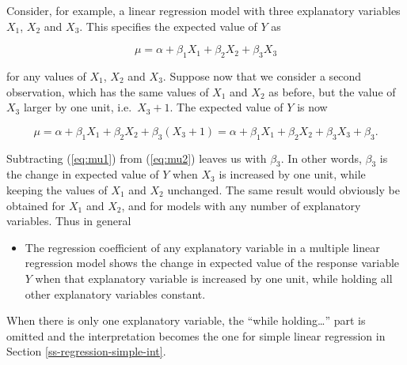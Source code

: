 \documentclass[11pt,a4paper,openany]{book}
\providecommand{\tightlist}{%
  \setlength{\itemsep}{0pt}\setlength{\parskip}{0pt}}
\begin{document}
Consider, for example, a linear regression model with three explanatory
variables \(X_{1}\), \(X_{2}\) and \(X_{3}\). This specifies the
expected value of \(Y\) as

\begin{equation}\mu=\alpha+\beta_{1}X_{1}+\beta_{2}X_{2}+\beta_{3}X_{3}
\label{eq:mu1}\end{equation}

for any values of \(X_{1}\), \(X_{2}\) and \(X_{3}\). Suppose now that
we consider a second observation, which has the same values of \(X_{1}\)
and \(X_{2}\) as before, but the value of \(X_{3}\) larger by one unit,
i.e.~\(X_{3}+1\). The expected value of \(Y\) is now

\begin{equation}\mu=\alpha+\beta_{1}X_{1}+\beta_{2}X_{2}+\beta_{3}(X_{3}+1)=
\alpha+\beta_{1}X_{1}+\beta_{2}X_{2}+\beta_{3}X_{3}+\beta_{3}.
\label{eq:mu2}\end{equation}

Subtracting (\ref{eq:mu1}) from (\ref{eq:mu2}) leaves us with
\(\beta_{3}\). In other words, \(\beta_{3}\) is the change in expected
value of \(Y\) when \(X_{3}\) is increased by one unit, while keeping
the values of \(X_{1}\) and \(X_{2}\) unchanged. The same result would
obviously be obtained for \(X_{1}\) and \(X_{2}\), and for models with
any number of explanatory variables. Thus in general

\begin{itemize}
\tightlist
\item
  The regression coefficient of any explanatory variable in a multiple
  linear regression model shows the change in expected value of the
  response variable \(Y\) when that explanatory variable is increased by
  one unit, while holding all other explanatory variables constant.
\end{itemize}

When there is only one explanatory variable, the ``while
holding\ldots{}'' part is omitted and the interpretation becomes the one
for simple linear regression in Section \ref{ss-regression-simple-int}.
\end{document}
